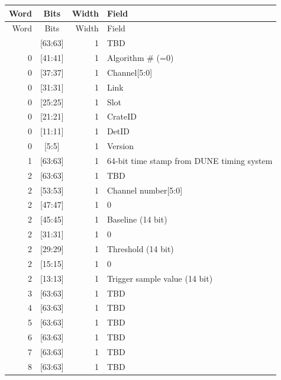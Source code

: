 \begin{longtable}{@{}r c r p{9.5cm}@{}}
\toprule
Word & Bits & Width & Field \\
\midrule
\endfirsthead
\toprule
Word & Bits & Width & Field \\
\midrule
\endhead
\bottomrule
\endfoot
0 & [63:63] & 1 & TBD \\
0 & [41:41] & 1 & Algorithm # (=0) \\
0 & [37:37] & 1 & Channel[5:0] \\
0 & [31:31] & 1 & Link \\
0 & [25:25] & 1 & Slot \\
0 & [21:21] & 1 & CrateID \\
0 & [11:11] & 1 & DetID \\
0 & [5:5] & 1 & Version \\
1 & [63:63] & 1 & 64-bit time stamp from DUNE timing system \\
2 & [63:63] & 1 & TBD \\
2 & [53:53] & 1 & Channel number[5:0] \\
2 & [47:47] & 1 & 0 \\
2 & [45:45] & 1 & Baseline (14 bit) \\
2 & [31:31] & 1 & 0 \\
2 & [29:29] & 1 & Threshold (14 bit) \\
2 & [15:15] & 1 & 0 \\
2 & [13:13] & 1 & Trigger sample value (14 bit) \\
3 & [63:63] & 1 & TBD \\
4 & [63:63] & 1 & TBD \\
5 & [63:63] & 1 & TBD \\
6 & [63:63] & 1 & TBD \\
7 & [63:63] & 1 & TBD \\
8 & [63:63] & 1 & TBD \\
\end{longtable}
\label{tab:header}